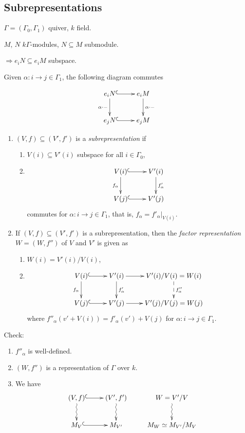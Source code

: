 \subsection{Subrepresentations}

$\Gamma = (\Gamma_0,\Gamma_1)$ quiver, $k$ field.

$M$, $N$ $k\Gamma$-modules, $N\subseteq M$ submodule.

$\Rightarrow e_iN\subseteq e_iM$ subspace.

Given $\alpha\colon i\to j \in \Gamma_1$, the following diagram commutes

\[\xymatrix{
e_i N \ar@{^(->}[r] \ar[d]_{\alpha\cdot-} & e_i M\ar[d]^{\alpha\cdot
  -}\\
e_jN \ar@{^(->}[r] & e_j M
}\]
\begin{defin}
\begin{enumerate}[\rm(a)]
\item $(V,f)\subseteq (V',f')$ is a
\emph{subrepresentation}
if
\begin{enumerate}[\rm(i)]
\item $V(i) \subseteq V'(i)$ subspace for all $i\in\Gamma_0$, 
\item \[\xymatrix{
V(i) \ar@{^(->}[r] \ar[d]_{f_\alpha} & V'(i)\ar[d]^{f'_\alpha}\\
V(j) \ar@{^(->}[r] & V'(j)}\]
commutes for $\alpha\colon i\to j\in\Gamma_1$, that is, $f_\alpha =
f'_\alpha|_{V(i)}$. 
\end{enumerate}
\item If $(V,f)\subseteq (V',f')$ is a subrepresentation, then the
  \emph{factor representation} $W=(W,f'')$ of $V$ and $V'$ is given as
\begin{enumerate}[\rm(i)] 
\item $W(i) = V'(i)/V(i)$, 
\item \[\xymatrix{
V(i) \ar@{^(->}[r] \ar[d]_{f_\alpha} & V'(i)\ar[d]^{f'_\alpha}\ar[r] & V'(i)/V(i)=W(i)\ar@{-->}[d]^{f''_\alpha} \\
V(j) \ar@{^(->}[r] & V'(j) \ar[r] & V'(j)/V(j)=W(j)}\]
where $f''_\alpha(v' + V(i)) = f'_\alpha(v') + V(j)$ for $\alpha\colon
i\to j\in\Gamma_1$. 
\end{enumerate}
\end{enumerate}
\end{defin}
Check: 
\begin{enumerate}[\rm(i)]
\item $f''_{\alpha}$ is well-defined.
\item $(W,f'')$ is a representation of ${\Gamma}$ over $k$. 
\item We have
\[\xymatrix{
(V,f) \ar@{^(->}[r]\ar@{~>}[d] & (V',f') \ar@{~>}[d]&  W = V'/V \ar@{~>}[d] \\
M_V \ar@{^(->}[r] & M_{V'} & M_W \simeq M_{V'}/M_V
}\]
\end{enumerate}


